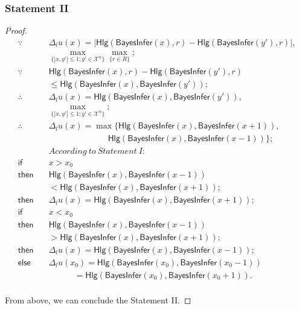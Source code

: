 \documentclass{article}
\begin{document}
\subsubsection{Statement II}
\begin{proof}

\begin{equation*}
\begin{split}
\because \quad 		& \Delta_l u(x) = |\mathsf{Hlg}(\mathsf{BayesInfer}(x), r) - \mathsf{Hlg}(\mathsf{BayesInfer}(y'), r)|,\\
					& \max_{\{|x,y'| \leq 1;y'\in \mathcal{X}^n\}}\max_{\{r\in R\}};\\
\because \quad 		& \mathsf{Hlg}(\mathsf{BayesInfer}(x), r) - \mathsf{Hlg}(\mathsf{BayesInfer}(y'), r)\\
					& \leq \mathsf{Hlg}(\mathsf{BayesInfer}(x), \mathsf{BayesInfer}(y'));\\
\therefore \quad 	& \Delta_l u(x) = \mathsf{Hlg}(\mathsf{BayesInfer}(x), \mathsf{BayesInfer}(y')),\\
					& \max_{\{|x,y'| \leq 1; y'\in \mathcal{X}^n\}};\\
\therefore \quad 	& \Delta_l u(x) = \max \{\mathsf{Hlg}(\mathsf{BayesInfer}(x), \mathsf{BayesInfer}(x + 1)),\\
					& \quad \quad \quad \quad \quad \quad \quad \mathsf{Hlg}(\mathsf{BayesInfer}(x), \mathsf{BayesInfer}(x - 1))\};\\
					& According\ to\ Statement\ I:\\
\mathsf{if}	  \quad	& x > x_0 \\
\mathsf{then} \quad	
					& \mathsf{Hlg}(\mathsf{BayesInfer}(x), \mathsf{BayesInfer}(x - 1))\\
					&< \mathsf{Hlg}(\mathsf{BayesInfer}(x), \mathsf{BayesInfer}(x + 1));\\
\mathsf{then} \quad	
					& \Delta_l u(x) = \mathsf{Hlg}(\mathsf{BayesInfer}(x), \mathsf{BayesInfer}(x + 1));\\
\mathsf{if}	 \quad	& x < x_0 \\
\mathsf{then} \quad	
					& \mathsf{Hlg}(\mathsf{BayesInfer}(x), \mathsf{BayesInfer}(x - 1))\\
					& > \mathsf{Hlg}(\mathsf{BayesInfer}(x), \mathsf{BayesInfer}(x + 1)); \\
\mathsf{then} \quad	
					& \Delta_l u(x) = \mathsf{Hlg}(\mathsf{BayesInfer}(x), \mathsf{BayesInfer}(x - 1));\\
\mathsf{else} \quad	
					& \Delta_l u(x_0) = \mathsf{Hlg}(\mathsf{BayesInfer}(x_0), \mathsf{BayesInfer}(x_0 - 1))\\
					& \quad \quad \quad = \mathsf{Hlg}(\mathsf{BayesInfer}(x_0), \mathsf{BayesInfer}(x_0 + 1)). \\
\end{split}
\end{equation*}

From above, we can conclude the Statement II.

\end{proof}
\end{document}

